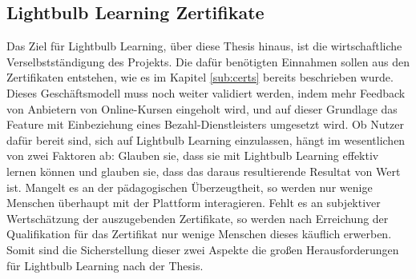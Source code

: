 \subsection{Lightbulb Learning Zertifikate}
Das Ziel für Lightbulb Learning, über diese Thesis hinaus, ist die wirtschaftliche Verselbstständigung des Projekts. Die dafür benötigten Einnahmen sollen aus den Zertifikaten entstehen, wie es im Kapitel \ref{sub:certs} bereits beschrieben wurde. Dieses Geschäftsmodell muss noch weiter validiert werden, indem mehr Feedback von Anbietern von Online-Kursen eingeholt wird, und auf dieser Grundlage das Feature mit Einbeziehung eines Bezahl-Dienstleisters umgesetzt wird. Ob Nutzer dafür bereit sind, sich auf Lightbulb Learning einzulassen, hängt im wesentlichen von zwei Faktoren ab: Glauben sie, dass sie mit Lightbulb Learning effektiv lernen können und glauben sie, dass das daraus resultierende Resultat von Wert ist. Mangelt es an der pädagogischen Überzeugtheit, so werden nur wenige Menschen überhaupt mit der Plattform interagieren. Fehlt es an subjektiver Wertschätzung der auszugebenden Zertifikate, so werden nach Erreichung der Qualifikation für das Zertifikat nur wenige Menschen dieses käuflich erwerben. Somit sind die Sicherstellung dieser zwei Aspekte die großen Herausforderungen für Lightbulb Learning nach der Thesis.